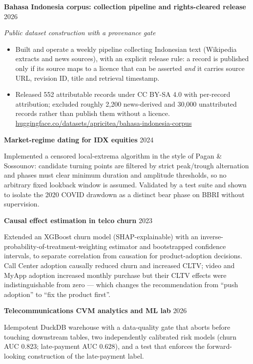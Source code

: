 \documentclass[11pt,a4paper]{article}
\newcommand{\heading}[2]{\textbf{#1} \hfill {\small\color{muted}#2}\par}
\newcommand{\subheading}[1]{\textit{\small #1}\par}
\begin{document}
\heading{Bahasa Indonesia corpus: collection pipeline and rights-cleared release}{2026}
\subheading{Public dataset construction with a provenance gate}

\begin{itemize}
  \item Built and operate a weekly pipeline collecting Indonesian text (Wikipedia extracts
        and news sources), with an explicit release rule: a record is published only if its
        source maps to a licence that can be asserted \emph{and} it carries source URL,
        revision ID, title and retrieval timestamp.
  \item Released 552 attributable records under CC BY-SA 4.0 with per-record attribution;
        excluded roughly 2{,}200 news-derived and 30{,}000 unattributed records rather than
        publish them without a licence.\\
        \href{https://huggingface.co/datasets/apricitea/bahasa-indonesia-corpus}{huggingface.co/datasets/apricitea/bahasa-indonesia-corpus}
\end{itemize}

\heading{Market-regime dating for IDX equities}{2024}

Implemented a censored local-extrema algorithm in the style of Pagan \& Sossounov: candidate
turning points are filtered by strict peak/trough alternation and phases must clear minimum
duration and amplitude thresholds, so no arbitrary fixed lookback window is assumed.
Validated by a test suite and shown to isolate the 2020 COVID drawdown as a distinct bear
phase on BBRI without supervision.

\heading{Causal effect estimation in telco churn}{2023}

Extended an XGBoost churn model (SHAP-explainable) with an inverse-probability-of-treatment-weighting
estimator and bootstrapped confidence intervals, to separate correlation from causation for
product-adoption decisions. Call Center adoption causally reduced churn and increased CLTV;
video and MyApp adoption increased monthly purchase but their CLTV effects were
indistinguishable from zero --- which changes the recommendation from ``push adoption'' to
``fix the product first''.

\heading{Telecommunications CVM analytics and ML lab}{2026}

Idempotent DuckDB warehouse with a data-quality gate that aborts before touching downstream
tables, two independently calibrated risk models (churn AUC 0.823; late-payment AUC 0.628),
and a test that enforces the forward-looking construction of the late-payment label.
\end{document}
